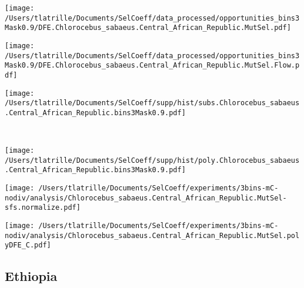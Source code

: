 \documentclass{article}
\begin{document}
    \begin{minipage}{0.32\linewidth}
        \texttt{[image: /Users/tlatrille/Documents/SelCoeff/data\_processed/opportunities\_bins3Mask0.9/DFE.Chlorocebus\_sabaeus.Central\_African\_Republic.MutSel.pdf]}
    \end{minipage}
    \begin{minipage}{0.32\linewidth}
        \texttt{[image: /Users/tlatrille/Documents/SelCoeff/data\_processed/opportunities\_bins3Mask0.9/DFE.Chlorocebus\_sabaeus.Central\_African\_Republic.MutSel.Flow.pdf]}
    \end{minipage}
    \begin{minipage}{0.32\linewidth}
        \texttt{[image: /Users/tlatrille/Documents/SelCoeff/supp/hist/subs.Chlorocebus\_sabaeus.Central\_African\_Republic.bins3Mask0.9.pdf]}
    \end{minipage}
    \\
    \begin{minipage}{0.32\linewidth}
        \texttt{[image: /Users/tlatrille/Documents/SelCoeff/supp/hist/poly.Chlorocebus\_sabaeus.Central\_African\_Republic.bins3Mask0.9.pdf]}
    \end{minipage}
    \begin{minipage}{0.32\linewidth}
        \texttt{[image: /Users/tlatrille/Documents/SelCoeff/experiments/3bins-mC-nodiv/analysis/Chlorocebus\_sabaeus.Central\_African\_Republic.MutSel-sfs.normalize.pdf]}
    \end{minipage}
    \begin{minipage}{0.32\linewidth}
        \texttt{[image: /Users/tlatrille/Documents/SelCoeff/experiments/3bins-mC-nodiv/analysis/Chlorocebus\_sabaeus.Central\_African\_Republic.MutSel.polyDFE\_C.pdf]}
    \end{minipage}
    \subsection{Ethiopia}
\end{document}
